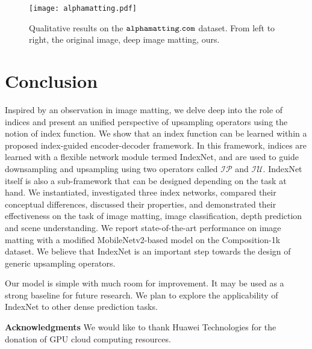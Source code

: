 \documentclass[10pt,twocolumn,letterpaper]{article}
\begin{document}
\begin{figure*}[!tb]
	\captionsetup{font=small,singlelinecheck=true}
	\setlength{\abovecaptionskip}{10pt}
	\centering
	\texttt{[image: alphamatting.pdf]}\caption{Qualitative results on the $\tt alphamatting.com$ dataset. From left to right, the original image, deep image matting, ours.}
	\label{fig:alphamatting}
\end{figure*}

\section{Conclusion}
Inspired by an observation in image matting, we delve deep into the role of indices and present an unified perspective of upsampling operators using the notion of index function. We show that an index function can be learned within a proposed index-guided encoder-decoder framework. In this framework, indices are learned with a flexible network module termed IndexNet, and are used to guide downsampling and upsampling using two operators called $\mathcal{IP}$ and $\mathcal{IU}$. IndexNet itself is also a sub-framework that can be designed depending on the task at hand. We instantiated, investigated three index networks, compared their conceptual differences, discussed their properties, and demonstrated their effectiveness on the task of image matting, image classification, depth prediction and scene understanding. We report state-of-the-art performance on image matting with a modified MobileNetv2-based model on the Composition-1k dataset. We believe that
IndexNet is an important step towards the design of generic upsampling operators.

Our model is simple with much room for improvement. It may be used as a strong baseline for future research. We plan to explore the applicability of IndexNet to other dense prediction tasks.


{\bf Acknowledgments}
We would like to thank Huawei Technologies for the donation of GPU cloud computing resources.

{\small


}
\end{document}
